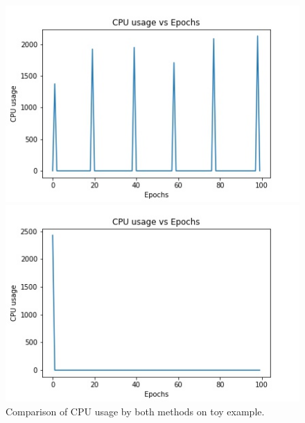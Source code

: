 \documentclass{cup-ino}
\begin{document}
\begin{figure}[h!]
\begin{minipage}{0.47\textwidth}
\includegraphics[width=\linewidth]{images/gen_toy_cpu.jpeg}
\end{minipage}
\hfill
\begin{minipage}{0.47\textwidth}
\includegraphics[width=\linewidth]{images/grad_toy_cpu.jpeg}
\end{minipage}

\caption{Comparison of CPU usage by both methods on toy example.}
\label{fig:toy_cpu}
\end{figure}
\end{document}
